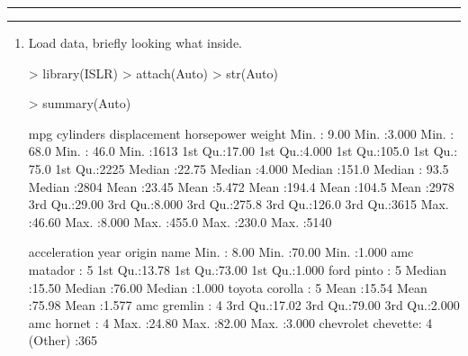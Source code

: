 \documentclass[a4paper]{article}
\newcommand{\question}[2] {\vspace{.25in} \hrule\vspace{0.5em}
\noindent{\bf #1: #2} \vspace{0.5em}
\hrule \vspace{.10in}}
\begin{document}
\newpage
\question{9}{Auto data set explore}

\begin{enumerate}
\item Load data, briefly looking what inside.
\begin{Schunk}
\begin{Sinput}
> library(ISLR)
> attach(Auto)
> str(Auto)
\end{Sinput}
\begin{Sinput}
> summary(Auto)
\end{Sinput}
\begin{Soutput}
      mpg          cylinders      displacement     horsepower        weight    
 Min.   : 9.00   Min.   :3.000   Min.   : 68.0   Min.   : 46.0   Min.   :1613  
 1st Qu.:17.00   1st Qu.:4.000   1st Qu.:105.0   1st Qu.: 75.0   1st Qu.:2225  
 Median :22.75   Median :4.000   Median :151.0   Median : 93.5   Median :2804  
 Mean   :23.45   Mean   :5.472   Mean   :194.4   Mean   :104.5   Mean   :2978  
 3rd Qu.:29.00   3rd Qu.:8.000   3rd Qu.:275.8   3rd Qu.:126.0   3rd Qu.:3615  
 Max.   :46.60   Max.   :8.000   Max.   :455.0   Max.   :230.0   Max.   :5140  
                                                                               
  acceleration        year           origin                      name    
 Min.   : 8.00   Min.   :70.00   Min.   :1.000   amc matador       :  5  
 1st Qu.:13.78   1st Qu.:73.00   1st Qu.:1.000   ford pinto        :  5  
 Median :15.50   Median :76.00   Median :1.000   toyota corolla    :  5  
 Mean   :15.54   Mean   :75.98   Mean   :1.577   amc gremlin       :  4  
 3rd Qu.:17.02   3rd Qu.:79.00   3rd Qu.:2.000   amc hornet        :  4  
 Max.   :24.80   Max.   :82.00   Max.   :3.000   chevrolet chevette:  4  
                                                 (Other)           :365  
\end{Soutput}
\end{Schunk}


\end{enumerate}
\end{document}
